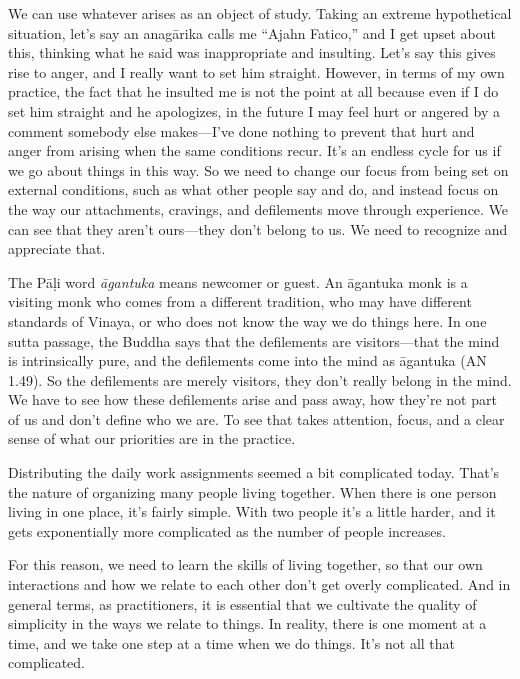 We can use whatever arises as an object of study. Taking an extreme 
hypothetical situation, let's say an anagārika calls me ``Ajahn 
Fatico,'' and I get upset about this, thinking what he said was 
inappropriate and insulting. Let's say this gives rise to anger, and I 
really want to set him straight. However, in terms of my own practice, 
the fact that he insulted me is not the point at all because even if I 
do set him straight and he apologizes, in the future I may feel hurt or 
angered by a comment somebody else makes---I've done nothing to prevent 
that hurt and anger from arising when the same conditions recur. It's 
an endless cycle for us if we go about things in this way. So we need 
to change our focus from being set on external conditions, such as what 
other people say and do, and instead focus on the way our attachments, 
cravings, and defilements move through experience. We can see that they 
aren't ours---they don't belong to us. We need to recognize and 
appreciate that.

The Pāḷi word \emph{āgantuka} means newcomer or guest. An āgantuka 
monk is a visiting monk who comes from a different tradition, who may 
have different standards of Vinaya, or who does not know the way we do 
things here. In one sutta passage, the Buddha says that the defilements 
are visitors---that the mind is intrinsically pure, and the defilements 
come into the mind as āgantuka (AN 1.49). So the defilements are 
merely visitors, they don't really belong in the mind. We have to see 
how these defilements arise and pass away, how they're not part of us 
and don't define who we are. To see that takes attention, focus, and a 
clear sense of what our priorities are in the practice.


Distributing the daily work assignments seemed a bit complicated today. 
That's the nature of organizing many people living together. When there 
is one person living in one place, it's fairly simple. With two people 
it's a little harder, and it gets exponentially more complicated as the 
number of people increases.

For this reason, we need to learn the skills of living together, so 
that our own interactions and how we relate to each other don't get 
overly complicated. And in general terms, as practitioners, it is 
essential that we cultivate the quality of simplicity in the ways we 
relate to things. In reality, there is one moment at a time, and we 
take one step at a time when we do things. It's not all that 
complicated.

